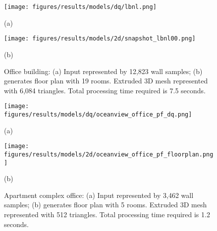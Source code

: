 \documentclass[a4paper,twoside]{article}
\begin{document}
\begin{figure*}[t]
	\centering
	
	\begin{minipage}[b]{0.495\linewidth}
	\centerline{\texttt{[image: figures/results/models/dq/lbnl.png]}}
	\centerline{(a)}
	\end{minipage}
	\hfill
	\begin{minipage}[b]{0.495\linewidth}
	\centerline{\texttt{[image: figures/results/models/2d/snapshot\_lbnl00.png]}}
	\centerline{(b)}
	\end{minipage}

	\caption{Office building: (a) Input represented by 12,823 wall samples; (b) generates floor plan with 19 rooms. Extruded 3D mesh represented with 6,084 triangles.  Total processing time required is 7.5 seconds.}
	\label{fig:results_a}
\end{figure*}

\begin{figure*}[t]
	\centering
	
	\begin{minipage}[b]{0.50\linewidth}
	\centerline{\texttt{[image: figures/results/models/dq/oceanview\_office\_pf\_dq.png]}}
	\centerline{(a)}
	\end{minipage}
	\hfill
	\begin{minipage}[b]{0.45\linewidth}
	\centerline{\texttt{[image: figures/results/models/2d/oceanview\_office\_pf\_floorplan.png]}}
	\centerline{(b)}
	\end{minipage}

	\caption{Apartment complex office: (a) Input represented by 3,462 wall samples; (b) generates floor plan with 5 rooms. Extruded 3D mesh represented with 512 triangles.  Total processing time required is 1.2 seconds.}
	\label{fig:results_d}
\end{figure*}
\end{document}
